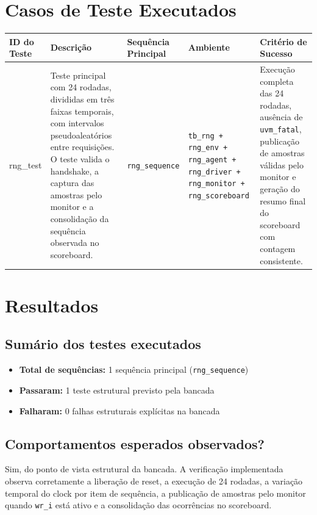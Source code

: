 \documentclass[12pt, a4paper]{article}
\begin{document}
	\section{Casos de Teste Executados}
	\begin{table}[h!]
		\centering
		\small
		\begin{tabular}{|p{4cm}|p{5cm}|p{4cm}|p{4cm}|p{4cm}|}
			\hline
			\textbf{ID do Teste} & \textbf{Descrição} & \textbf{Sequência Principal} & \textbf{Ambiente} & \textbf{Critério de Sucesso} \\ \hline
			rng\_test & Teste principal com 24 rodadas, divididas em três faixas temporais, com intervalos pseudoaleatórios entre requisições. O teste valida o handshake, a captura das amostras pelo monitor e a consolidação da sequência observada no scoreboard. & \texttt{rng\_sequence} & \texttt{tb\_rng + rng\_env + rng\_agent + rng\_driver + rng\_monitor + rng\_scoreboard} & Execução completa das 24 rodadas, ausência de \texttt{uvm\_fatal}, publicação de amostras válidas pelo monitor e geração do resumo final do scoreboard com contagem consistente. \\ \hline
		\end{tabular}
	\end{table}
	
	\section{Resultados}
	\subsection{Sumário dos testes executados}
	\begin{itemize}
		\item \textbf{Total de sequências:} 1 sequência principal (\texttt{rng\_sequence})
		\item \textbf{Passaram:} 1 teste estrutural previsto pela bancada
		\item \textbf{Falharam:} 0 falhas estruturais explícitas na bancada
	\end{itemize}
	
	\subsection{Comportamentos esperados observados?}
	Sim, do ponto de vista estrutural da bancada. A verificação implementada observa corretamente a liberação de reset, a execução de 24 rodadas, a variação temporal do clock por item de sequência, a publicação de amostras pelo monitor quando \texttt{wr\_i} está ativo e a consolidação das ocorrências no scoreboard.
	
\end{document}

